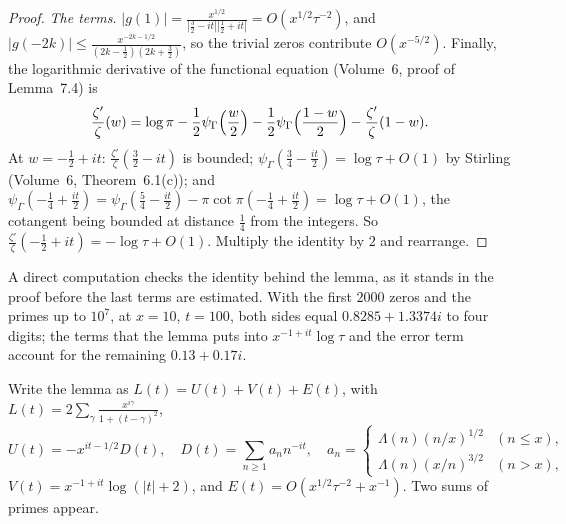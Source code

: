 \begin{proof}
\emph{The terms.} $|g(1)|=\frac{x^{1/2}}{|\frac32-it||\frac12+it|}=O(x^{1/2}\tau^{-2})$, and $|g(-2k)|\le\frac{x^{-2k-1/2}}{(2k-\frac12)(2k+\frac32)}$, so the trivial zeros contribute $O(x^{-5/2})$. Finally, the logarithmic derivative of the functional equation (Volume~6, proof of Lemma~7.4) is
\[
\frac{\zeta'}\zeta(w)=\log\pi-\frac12\psi_\Gamma\Bigl(\frac w2\Bigr)-\frac12\psi_\Gamma\Bigl(\frac{1-w}2\Bigr)-\frac{\zeta'}\zeta(1-w).
\]
At $w=-\frac12+it$: $\frac{\zeta'}\zeta(\frac32-it)$ is bounded; $\psi_\Gamma(\frac34-\frac{it}2)=\log\tau+O(1)$ by Stirling (Volume~6, Theorem~6.1(c)); and $\psi_\Gamma(-\frac14+\frac{it}2)=\psi_\Gamma(\frac54-\frac{it}2)-\pi\cot\pi(-\frac14+\frac{it}2)=\log\tau+O(1)$, the cotangent being bounded at distance $\frac14$ from the integers. So $\frac{\zeta'}\zeta(-\frac12+it)=-\log\tau+O(1)$. Multiply the identity by $2$ and rearrange.
\end{proof}

A direct computation checks the identity behind the lemma, as it stands in the proof before the last terms are estimated. With the first $2000$ zeros and the primes up to $10^7$, at $x=10$, $t=100$, both sides equal $0.8285+1.3374i$ to four digits; the terms that the lemma puts into $x^{-1+it}\log\tau$ and the error term account for the remaining $0.13+0.17i$.

Write the lemma as $L(t)=U(t)+V(t)+E(t)$, with $L(t)=2\sum_\gamma\frac{x^{i\gamma}}{1+(t-\gamma)^2}$,
\[
U(t)=-x^{it-1/2}D(t),\quad D(t)=\sum_{n\ge1}a_nn^{-it},\quad a_n=\begin{cases}\Lambda(n)(n/x)^{1/2}&(n\le x),\\\Lambda(n)(x/n)^{3/2}&(n>x),\end{cases}
\]
$V(t)=x^{-1+it}\log(|t|+2)$, and $E(t)=O(x^{1/2}\tau^{-2}+x^{-1})$. Two sums of primes appear.

